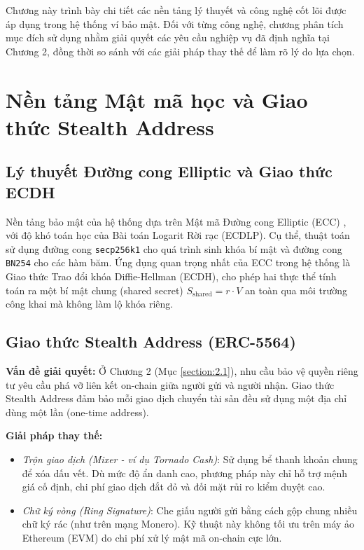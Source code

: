 \documentclass[../DoAn.tex]{subfiles}
\begin{document}
Chương này trình bày chi tiết các nền tảng lý thuyết và công nghệ cốt lõi được áp dụng trong hệ thống ví bảo mật. Đối với từng công nghệ, chương phân tích mục đích sử dụng nhằm giải quyết các yêu cầu nghiệp vụ đã định nghĩa tại Chương 2, đồng thời so sánh với các giải pháp thay thế để làm rõ lý do lựa chọn.

\section{Nền tảng Mật mã học và Giao thức Stealth Address}
\label{sec:3.1}

\subsection{Lý thuyết Đường cong Elliptic và Giao thức ECDH}
Nền tảng bảo mật của hệ thống dựa trên Mật mã Đường cong Elliptic (ECC) \cite{ecc}, với độ khó toán học của Bài toán Logarit Rời rạc (ECDLP). Cụ thể, thuật toán sử dụng đường cong \texttt{secp256k1} cho quá trình sinh khóa bí mật và đường cong \texttt{BN254} cho các hàm băm. Ứng dụng quan trọng nhất của ECC trong hệ thống là Giao thức Trao đổi khóa Diffie-Hellman (ECDH), cho phép hai thực thể tính toán ra một bí mật chung (shared secret) $S_{\text{shared}} = r \cdot V$ an toàn qua môi trường công khai mà không làm lộ khóa riêng.

\subsection{Giao thức Stealth Address (ERC-5564)}
\textbf{Vấn đề giải quyết:} Ở Chương 2 (Mục \ref{section:2.1}), nhu cầu bảo vệ quyền riêng tư yêu cầu phá vỡ liên kết on-chain giữa người gửi và người nhận. Giao thức Stealth Address đảm bảo mỗi giao dịch chuyển tài sản đều sử dụng một địa chỉ dùng một lần (one-time address).

\textbf{Giải pháp thay thế:}
\begin{itemize}
    \item \textit{Trộn giao dịch (Mixer - ví dụ Tornado Cash)}: Sử dụng bể thanh khoản chung để xóa dấu vết. Dù mức độ ẩn danh cao, phương pháp này chỉ hỗ trợ mệnh giá cố định, chi phí giao dịch đắt đỏ và đối mặt rủi ro kiểm duyệt cao.
    \item \textit{Chữ ký vòng (Ring Signature)}: Che giấu người gửi bằng cách gộp chung nhiều chữ ký rác (như trên mạng Monero). Kỹ thuật này không tối ưu trên máy ảo Ethereum (EVM) do chi phí xử lý mật mã on-chain cực lớn.
\end{itemize}
\end{document}

